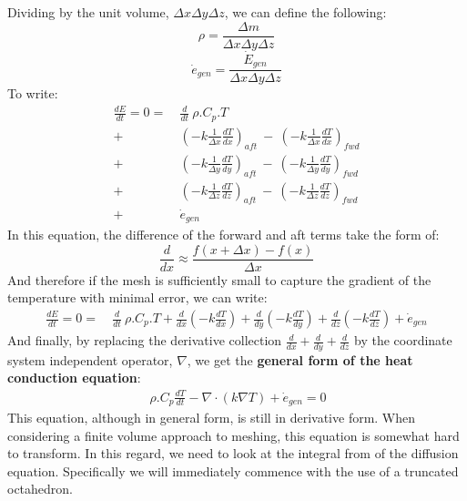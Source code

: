 \documentclass[11pt,letterpaper,titlepage]{article}
\begin{document}
Dividing by the unit volume, $\Delta x \Delta y \Delta z$, we can define the following:
$$
\rho = \frac{\Delta m}{\Delta x \Delta y \Delta z}
$$
$$
\dot{e}_{gen}=\frac{\dot{E}_{gen}}{\Delta x \Delta y \Delta z}
$$
To write:
\begin{equation*}
\begin{aligned}
\frac{dE}{dt}=0= & \ \frac{d}{dt} \ \rho.C_p.T \\
			   + & \ (-k\frac{1}{\Delta x}\frac{dT}{dx})_{aft} \ - \ (-k\frac{1}{\Delta x}\frac{dT}{dx})_{fwd} \\
	           + & \ (-k\frac{1}{\Delta y}\frac{dT}{dy})_{aft} \ - \ (-k\frac{1}{\Delta y}\frac{dT}{dy})_{fwd} \\
	           + & \ (-k\frac{1}{\Delta z} \frac{dT}{dz})_{aft} \ - \ (-k\frac{1}{\Delta z} \frac{dT}{dz})_{fwd} \\
	           + & \ \dot{e}_{gen}		       
\end{aligned}
\end{equation*}
\newline
In this equation, the difference of the forward and aft terms take the form of:
$$
\frac{d}{dx}\approx \frac{f(x+\Delta x)-f(x)}{\Delta x}
$$
And therefore if the mesh is sufficiently small to capture the gradient of the temperature with minimal error, we can write:
\begin{equation*}
\begin{aligned}
\frac{dE}{dt}=0= & \ \frac{d}{dt} \ \rho.C_p.T + \frac{d}{dx}(-k\frac{dT}{dx}) + \frac{d}{dy}(-k\frac{dT}{dy}) + \frac{d}{dz}(-k\frac{dT}{dz}) + \dot{e}_{gen}     
\end{aligned}
\end{equation*}
\newline
And finally, by replacing the derivative collection $\frac{d}{dx}+\frac{d}{dy}+\frac{d}{dz}$ by the coordinate system independent operator, $\nabla$, we get the \textbf{general form of the heat conduction equation}:
\newline
\begin{equation}
\begin{aligned}
 \ \rho.C_p \frac{dT}{dt} - \nabla \cdot (k \nabla T) + \dot{e}_{gen} =0
\end{aligned}
\label{equation:genHeatCon}
\end{equation}
\newline
This equation, although in general form, is still in derivative form. When considering a finite volume approach to meshing, this equation is somewhat hard to transform. In this regard, we need to look at the integral from of the diffusion equation. Specifically we will immediately commence with the use of a truncated octahedron.
\end{document}
